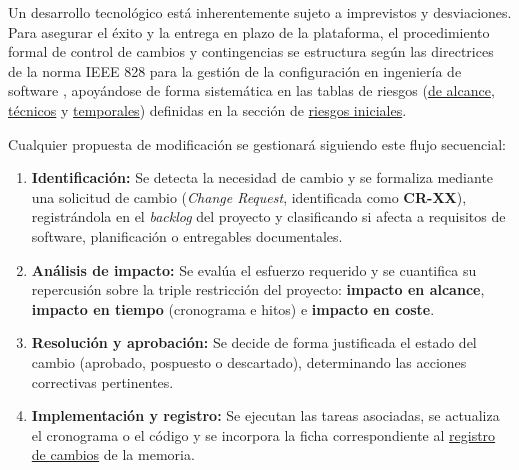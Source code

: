 Un desarrollo tecnológico está inherentemente sujeto a imprevistos y desviaciones. Para asegurar el éxito y la entrega en plazo de la plataforma, el procedimiento formal de control de cambios y contingencias se estructura según las directrices de la norma IEEE 828 para la gestión de la configuración en ingeniería de software \cite{ieee828}, apoyándose de forma sistemática en las tablas de riesgos (\hyperref[tab:riesgos_alcance]{de alcance}, \hyperref[tab:riesgos_tecnicos]{técnicos} y \hyperref[tab:riesgos_temporales]{temporales}) definidas en la sección de \hyperref[sec:riesgos_iniciales]{riesgos iniciales}.

Cualquier propuesta de modificación se gestionará siguiendo este flujo secuencial:

\begin{enumerate}
    \item \textbf{Identificación:} Se detecta la necesidad de cambio y se formaliza mediante una solicitud de cambio (\textit{Change Request}, identificada como \textbf{CR-XX}), registrándola en el \textit{backlog} del proyecto y clasificando si afecta a requisitos de software, planificación o entregables documentales.
    \item \textbf{Análisis de impacto:} Se evalúa el esfuerzo requerido y se cuantifica su repercusión sobre la triple restricción del proyecto: \textbf{impacto en alcance}, \textbf{impacto en tiempo} (cronograma e hitos) e \textbf{impacto en coste}.
    \item \textbf{Resolución y aprobación:} Se decide de forma justificada el estado del cambio (aprobado, pospuesto o descartado), determinando las acciones correctivas pertinentes.
    \item \textbf{Implementación y registro:} Se ejecutan las tareas asociadas, se actualiza el cronograma o el código y se incorpora la ficha correspondiente al \hyperref[sub:registro_cambios]{registro de cambios} de la memoria.
\end{enumerate}
